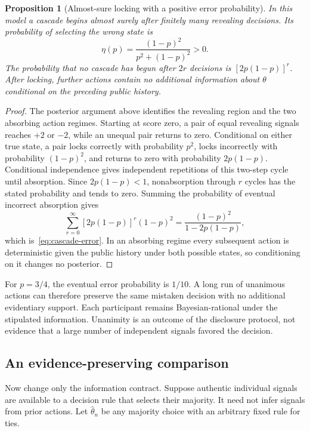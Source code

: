 \documentclass[11pt,letterpaper]{article}
\theoremstyle{plain}
\newtheorem{proposition}{Proposition}[section]
\theoremstyle{definition}
\theoremstyle{remark}
\begin{document}
\begin{proposition}[Almost-sure locking with a positive error probability]\label{prop:cascade-lock}
In this model a cascade begins almost surely after finitely many revealing decisions. Its probability of selecting the wrong state is
\begin{equation}\label{eq:cascade-error}
\eta(p)=\frac{(1-p)^2}{p^2+(1-p)^2}>0.
\end{equation}
The probability that no cascade has begun after $2r$ decisions is $[2p(1-p)]^r$. After locking, further actions contain no additional information about $\theta$ conditional on the preceding public history.
\end{proposition}
\begin{proof}
The posterior argument above identifies the revealing region and the two absorbing action regimes. Starting at score zero, a pair of equal revealing signals reaches $+2$ or $-2$, while an unequal pair returns to zero. Conditional on either true state, a pair locks correctly with probability $p^2$, locks incorrectly with probability $(1-p)^2$, and returns to zero with probability $2p(1-p)$. Conditional independence gives independent repetitions of this two-step cycle until absorption. Since $2p(1-p)<1$, nonabsorption through $r$ cycles has the stated probability and tends to zero. Summing the probability of eventual incorrect absorption gives
\[
\sum_{r=0}^{\infty}[2p(1-p)]^r(1-p)^2
=\frac{(1-p)^2}{1-2p(1-p)},
\]
which is~\eqref{eq:cascade-error}. In an absorbing regime every subsequent action is deterministic given the public history under both possible states, so conditioning on it changes no posterior.
\end{proof}

For $p=3/4$, the eventual error probability is $1/10$. A long run of unanimous actions can therefore preserve the same mistaken decision with no additional evidentiary support. Each participant remains Bayesian-rational under the stipulated information. Unanimity is an outcome of the disclosure protocol, not evidence that a large number of independent signals favored the decision.

\subsection{An evidence-preserving comparison}
Now change only the information contract. Suppose authentic individual signals are available to a decision rule that selects their majority. It need not infer signals from prior actions. Let $\widehat\theta_n$ be any majority choice with an arbitrary fixed rule for ties.
\end{document}
